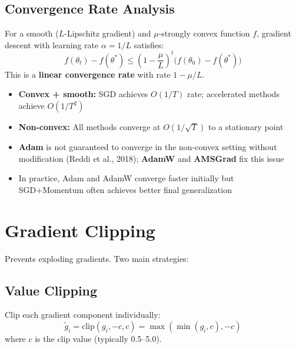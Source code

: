\subsection{Convergence Rate Analysis}

\begin{theorem}
For a smooth ($L$-Lipschitz gradient) and $\mu$-strongly convex function $f$, gradient descent with learning rate $\alpha = 1/L$ satisfies:
\begin{equation}
f(\theta_t) - f(\theta^*) \leq \left(1 - \frac{\mu}{L}\right)^t \bigl(f(\theta_0) - f(\theta^*)\bigr)
\end{equation}
This is a \textbf{linear convergence rate} with rate $1 - \mu/L$.
\end{theorem}

\begin{properties}
\begin{itemize}
    \item \textbf{Convex + smooth:} SGD achieves $O(1/T)$ rate; accelerated methods achieve $O(1/T^2)$
    \item \textbf{Non-convex:} All methods converge at $O(1/\sqrt{T})$ to a stationary point
    \item \textbf{Adam} is not guaranteed to converge in the non-convex setting without modification (Reddi et al., 2018); \textbf{AdamW} and \textbf{AMSGrad} fix this issue
    \item In practice, Adam and AdamW converge faster initially but SGD+Momentum often achieves better final generalization
\end{itemize}
\end{properties}

\section{Gradient Clipping}

Prevents exploding gradients. Two main strategies:

\subsection{Value Clipping}

Clip each gradient component individually:
\begin{equation}
\tilde{g}_i = \text{clip}(g_i, -c, c) = \max(\min(g_i, c), -c)
\end{equation}
where $c$ is the clip value (typically 0.5--5.0).

